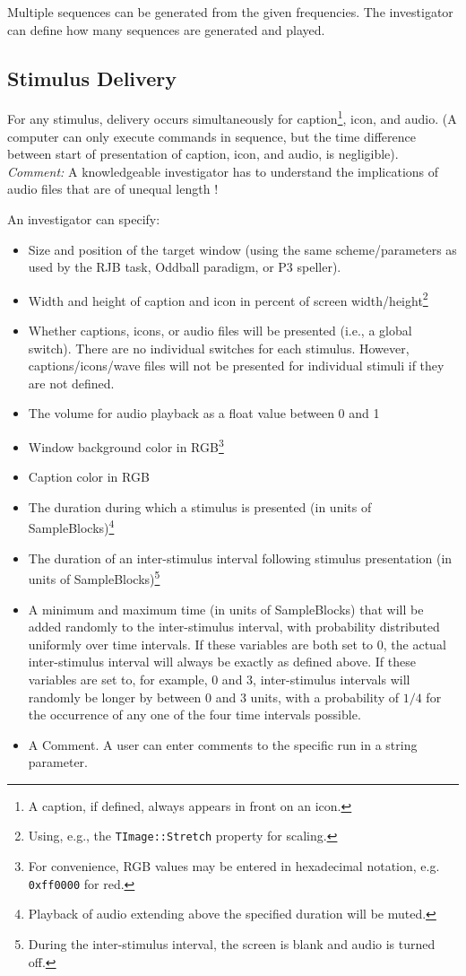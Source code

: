 \documentclass[letterpaper,oneside,12pt]{article}
\begin{document}
Multiple sequences can be generated from the given frequencies.
The investigator can define how many sequences are generated and played.

\subsection{Stimulus Delivery}

For any stimulus, delivery occurs simultaneously for caption\footnote{A caption, 
if defined, always appears in front on an icon.}, icon, and audio. (A computer 
can only execute commands in sequence, but the time difference between start of 
presentation of caption, icon, and audio, is negligible). \emph{Comment:} A 
knowledgeable investigator has to understand the implications of audio files 
that are of unequal length !

An investigator can specify:
\begin{itemize}
 \item Size and position of the target window (using the same scheme/parameters 
       as used by the RJB task, Oddball paradigm, or P3 speller).
 \item Width and height of caption and icon in percent of screen
       width/height\footnote{Using, e.g., the \texttt{TImage::Stretch} property for scaling.}
 \item Whether captions, icons, or audio files will be presented
       (i.e., a global switch). There are no individual switches for each stimulus. However,
       captions/icons/wave files will not be presented for individual stimuli if they are not defined.
 \item The volume for audio playback as a float value between 0 and 1
 \item Window background color in RGB\footnote{For convenience, RGB values
       may be entered in hexadecimal notation, e.g. \texttt{0xff0000} for red.}
 \item Caption color in RGB
 \item The duration during which a stimulus is presented (in units of
       SampleBlocks)\footnote{Playback of audio extending above the specified duration 
       will be muted.}
 \item The duration of an inter-stimulus interval following stimulus presentation
       (in units of SampleBlocks)\footnote{During the inter-stimulus interval, the
       screen is blank and audio is turned off.}
 \item A minimum and maximum time (in units of SampleBlocks) that will be added randomly
       to the inter-stimulus interval, with probability distributed uniformly over time
       intervals.
       If these variables are both set to 0, the actual inter-stimulus interval will
       always be exactly as defined above.
       If these variables are set to, for example, 0 and 3, inter-stimulus intervals
       will randomly be longer by between 0 and 3 units, with a probability of $1/4$
       for the occurrence of any one of the four time intervals possible.
 \item A Comment. A user can enter comments to the specific run in a string parameter.
\end{itemize}
\end{document}

